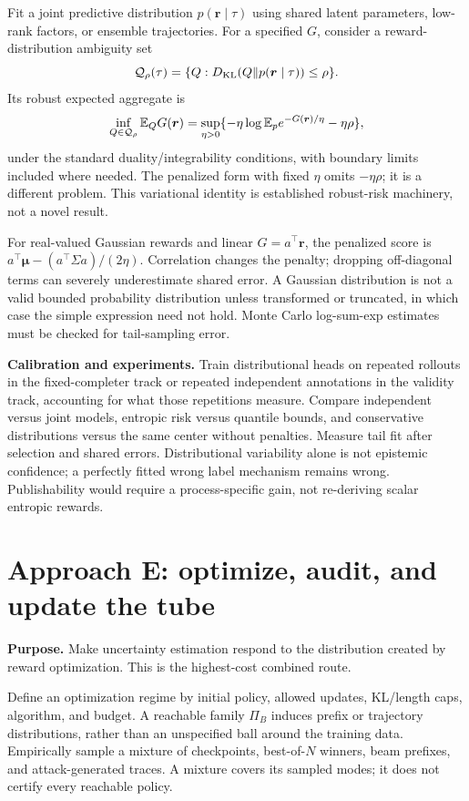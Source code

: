 Fit a joint predictive distribution $p(\bm r\mid\tau)$ using shared latent
parameters, low-rank factors, or ensemble trajectories. For a specified $G$,
consider a reward-distribution ambiguity set
\[
 \mathcal Q_\rho(\tau)=\{Q:D_{\mathrm{KL}}(Q\|p(\bm r\mid\tau))\le\rho\}.
\]
Its robust expected aggregate is
\[
 \inf_{Q\in\mathcal Q_\rho}\mathbb{E}_Q G(\bm r)
 =\sup_{\eta>0}\{-\eta\log\mathbb{E}_p e^{-G(\bm r)/\eta}-\eta\rho\},
\]
under the standard duality/integrability conditions, with boundary limits
included where needed. The penalized form with fixed $\eta$ omits $-\eta\rho$;
it is a different problem. This variational identity is established robust-risk
machinery, not a novel result.

For real-valued Gaussian rewards and linear $G=a^\top\bm r$, the penalized
score is
$a^\top\bm\mu-(a^\top\Sigma a)/(2\eta)$. Correlation changes the penalty;
dropping off-diagonal terms can severely underestimate shared error. A Gaussian
distribution is not a valid bounded probability distribution unless transformed
or truncated, in which case the simple expression need not hold. Monte Carlo
log-sum-exp estimates must be checked for tail-sampling error.

\textbf{Calibration and experiments.} Train distributional heads on repeated
rollouts in the fixed-completer track or repeated independent annotations in
the validity track, accounting for what those repetitions measure. Compare
independent versus joint models, entropic risk versus quantile bounds, and
conservative distributions versus the same center without penalties. Measure
tail fit after selection and shared errors. Distributional variability alone is
not epistemic confidence; a perfectly fitted wrong label mechanism remains
wrong. Publishability would require a process-specific gain, not re-deriving
scalar entropic rewards.

\section{Approach E: optimize, audit, and update the tube}
\textbf{Purpose.} Make uncertainty estimation respond to the distribution created
by reward optimization. This is the highest-cost combined route.

Define an optimization regime by initial policy, allowed updates, KL/length
caps, algorithm, and budget. A reachable family $\Pi_B$ induces prefix or
trajectory distributions, rather than an unspecified ball around the training
data. Empirically sample a mixture of checkpoints, best-of-$N$ winners, beam
prefixes, and attack-generated traces. A mixture covers its sampled modes;
it does not certify every reachable policy.

